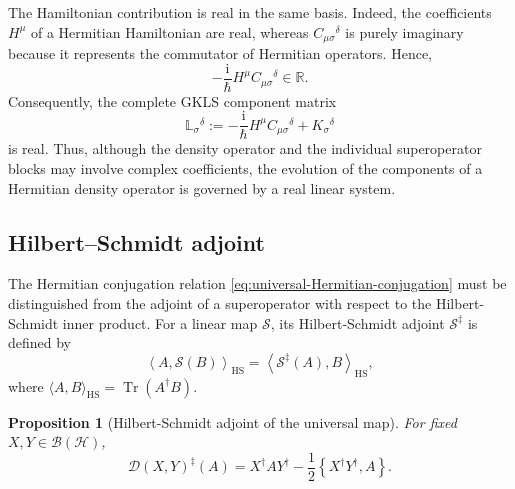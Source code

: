 \documentclass[notitlepage,aip,reprint,onecolumn]{revtex4-1}
\newtheorem{proposition}[theorem]{Proposition}
\theoremstyle{definition}
\begin{document}
The Hamiltonian contribution is real in the same basis. Indeed, the coefficients \(H^\mu\) of a Hermitian Hamiltonian are real, whereas \(C_{\mu\sigma}{}^\delta\) is purely imaginary because it represents the commutator of Hermitian operators. Hence,
\[
    -\frac{\mathrm{i}}{\hbar}
    H^\mu C_{\mu\sigma}{}^\delta
    \in\mathbb R.
\]
Consequently, the complete GKLS component matrix
\begin{equation}\label{eq:full-real-GKLS-matrix}
    \mathbb L_\sigma{}^\delta
    :=
    -\frac{\mathrm{i}}{\hbar}
    H^\mu C_{\mu\sigma}{}^\delta
    +
    K_\sigma{}^\delta
\end{equation}
is real. Thus, although the density operator and the individual superoperator blocks may involve complex coefficients, the evolution of the components of a Hermitian density operator is governed by a real linear system.

\subsection{Hilbert--Schmidt adjoint}

The Hermitian conjugation relation \eqref{eq:universal-Hermitian-conjugation} must be distinguished from the adjoint of a superoperator with respect to the Hilbert-Schmidt inner product. For a linear map \(\mathcal S\), its Hilbert-Schmidt adjoint \(\mathcal S^\ddagger\) is defined by
\begin{equation}\label{eq:HS-superoperator-adjoint-def}
    \left\langle
    A,\mathcal S(B)
    \right\rangle_{\mathrm{HS}}
    =
    \left\langle
    \mathcal S^\ddagger(A),B
    \right\rangle_{\mathrm{HS}},
\end{equation}
where
\( \langle A,B\rangle_{\mathrm{HS}} = \operatorname{Tr}(A^\dagger B) \).

\begin{proposition}[Hilbert-Schmidt adjoint of the universal map]
For fixed \(X,Y\in\mathcal B(\mathcal H)\),
\begin{equation}\label{eq:HS-adjoint-universal-D}
    \mathcal D(X,Y)^\ddagger(A)
    =
    X^\dagger A Y^\dagger
    -
    \frac12
    \left\{
    X^\dagger Y^\dagger,A
    \right\}.
\end{equation}
\end{proposition}
\end{document}

